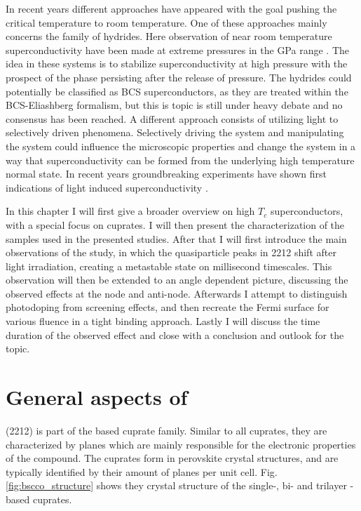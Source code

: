 In recent years different approaches have appeared with the goal pushing the critical temperature to room temperature.
One of these approaches mainly concerns the family of hydrides.
Here observation of near room temperature superconductivity have been made at extreme pressures in the \unit{\giga\pascal} range \cite{duan_structure_2017}.
The idea in these systems is to stabilize superconductivity at high pressure with the prospect of the phase persisting after the release of pressure.
The hydrides could potentially be classified as BCS superconductors, as they are treated within the BCS-Eliashberg formalism, but this is topic is still under heavy debate and no consensus has been reached.
A different approach consists of utilizing light to selectively driven phenomena.
Selectively driving the system and manipulating the system could influence the microscopic properties and change the system in a way that superconductivity can be formed from the underlying high temperature normal state.
In recent years groundbreaking experiments have shown first indications of light induced superconductivity \cite{fausti_light-induced_2011,buzzi_phase_2021,fava_magnetic_2024}.

In this chapter I will first give a broader overview on high $T_c$ superconductors, with a special focus on cuprates.
I will then present the characterization of the samples used in the presented studies.
After that I will first introduce the main observations of the study, in which the quasiparticle peaks in 2212 shift after light irradiation, creating a metastable state on millisecond timescales.
This observation will then be extended to an angle dependent picture, discussing the observed effects at the node and anti-node.
Afterwards I attempt to distinguish photodoping from screening effects, and then recreate the Fermi surface for various fluence in a tight binding approach.
Lastly I will discuss the time duration of the observed effect and close with a conclusion and outlook for the topic.

\section{General aspects of }
\label{sec:bscco_general}

 (2212) is part of the  based cuprate family.
Similar to all cuprates, they are characterized by  planes which are mainly responsible for the electronic properties of the compound.
The cuprates form in perovskite crystal structures, and are typically identified by their amount of  planes per unit cell.
Fig. \ref{fig:bscco_structure} shows they crystal structure of the single-, bi- and trilayer -based cuprates.

